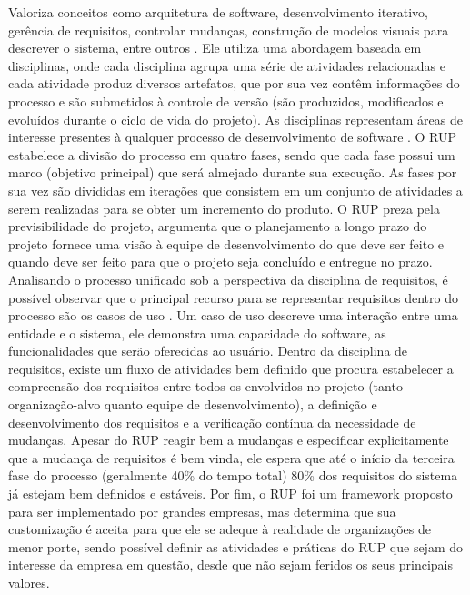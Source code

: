 Valoriza conceitos como arquitetura de software, desenvolvimento iterativo, gerência de requisitos, controlar mudanças, construção de modelos visuais para descrever o sistema, entre outros \cite{kruchten001}. Ele utiliza uma abordagem baseada em disciplinas, onde cada disciplina agrupa uma série de atividades relacionadas e cada atividade produz diversos artefatos, que por sua vez contêm informações do processo e são submetidos à controle de versão (são produzidos, modificados e evoluídos durante o ciclo de vida do projeto). As disciplinas representam áreas de interesse presentes à qualquer processo de desenvolvimento de software \cite{kruchten001}. O RUP estabelece a divisão do processo em quatro fases, sendo que cada fase possui um marco (objetivo principal) que será almejado durante sua execução. As fases por sua vez são divididas em iterações que consistem em um conjunto de atividades a serem realizadas para se obter um incremento do produto. O RUP preza pela previsibilidade do projeto, argumenta que o planejamento a longo prazo do projeto fornece uma visão à equipe de desenvolvimento do que deve ser feito e quando deve ser feito para que o projeto seja concluído e entregue no prazo. Analisando o processo unificado sob a perspectiva da disciplina de requisitos, é possível observar que o principal recurso para se representar requisitos dentro do processo são os casos de uso \cite{kruchten001}. Um caso de uso descreve uma interação entre uma entidade e o sistema, ele demonstra uma capacidade do software, as funcionalidades que serão oferecidas ao usuário. Dentro da disciplina de requisitos, existe um fluxo de atividades bem definido que procura estabelecer a compreensão dos requisitos entre todos os envolvidos no projeto (tanto organização-alvo quanto equipe de desenvolvimento), a definição e desenvolvimento dos requisitos e a verificação contínua da necessidade de mudanças. Apesar do RUP reagir bem a mudanças e especificar explicitamente que a mudança de requisitos é bem vinda, ele espera que até o início da terceira fase do processo (geralmente 40\% do tempo total) 80\% dos requisitos do sistema já estejam bem definidos e estáveis.
Por fim, o RUP foi um framework proposto para ser implementado por grandes empresas, mas determina que sua customização é aceita para que ele se adeque à realidade de organizações  de menor porte, sendo possível definir as atividades e práticas do RUP que sejam do interesse da empresa em questão, desde que não sejam feridos os seus principais valores.

